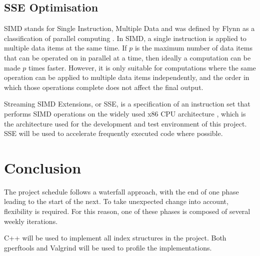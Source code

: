 \subsection{SSE Optimisation}
\label{sec:sse}

SIMD stands for Single Instruction, Multiple Data and was defined by Flynn as a classification of parallel computing \cite{flynns-taxonomy}. In SIMD, a single instruction is applied to multiple data items at the same time. If $p$ is the maximum number of data items that can be operated on in parallel at a time, then ideally a computation can be made $p$ times faster. However, it is only suitable for computations where the same operation can be applied to multiple data items independently, and the order in which those operations complete does not affect the final output.

Streaming SIMD Extensions, or SSE, is a specification of an instruction set that performs SIMD operations on the widely used x86 CPU architecture \cite{sse}, which is the architecture used for the development and test environment of this project. SSE will be used to accelerate frequently executed code where possible.

\section{Conclusion}

The project schedule follows a waterfall approach, with the end of one phase leading to the start of the next. To take unexpected change into account, flexibility is required. For this reason, one of these phases is composed of several weekly iterations.

C++ will be used to implement all index structures in the project. Both gperftools and Valgrind will be used to profile the implementations.